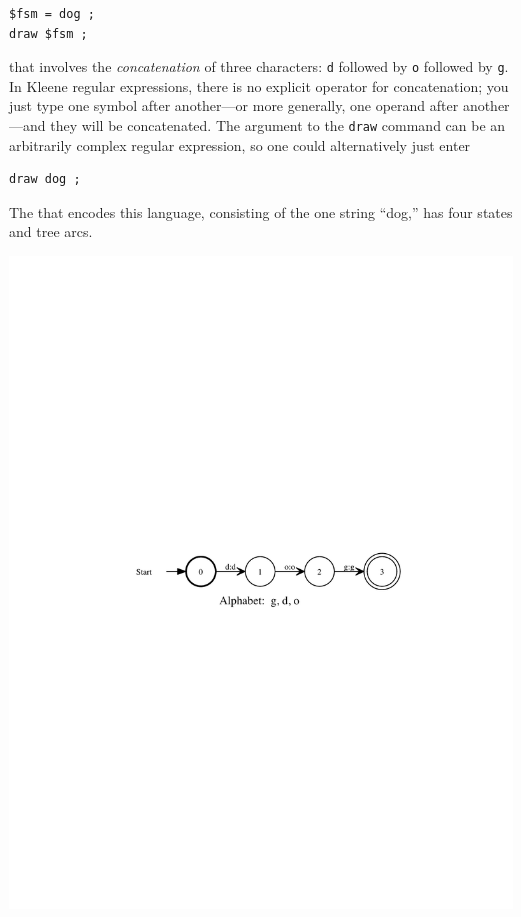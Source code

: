 \begin{Verbatim}
$fsm = dog ;
draw $fsm ;
\end{Verbatim}

\noindent
that involves the \emph{concatenation} of three characters: \texttt{d} followed by
\texttt{o} followed by \texttt{g}.   In Kleene regular expressions, there is no
explicit operator for concatenation; you just type one symbol after another---or
more generally, one operand after another---and they will be concatenated.  
The argument to the \texttt{draw} command can be
an arbitrarily complex regular expression, so one could alternatively just enter

\begin{Verbatim}
draw dog ;
\end{Verbatim}

The \fsm{} that encodes this language, consisting
of the one string ``dog,'' has four states and tree arcs.

\begin{center}
\includegraphics{images/dog.pdf}
\end{center}

